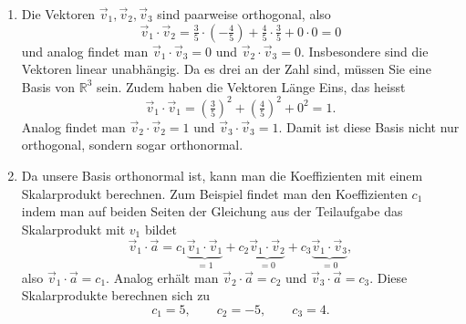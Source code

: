 \begin{losung*}
	\phantom{text}
	\begin{enumerate}[label=(\alph*)]
		\item Die Vektoren $\vec v_1,\vec v_2,\vec v_3$ sind paarweise orthogonal, also
		\begin{equation*}
			\vec v_1\cdot\vec v_2= \tfrac{3}{5}\cdot\left(-\tfrac{4}{5}\right)+\tfrac{4}{5}\cdot\tfrac{3}{5}+0\cdot 0=0
		\end{equation*}
		und analog findet man $\vec v_1\cdot\vec v_3=0$ und $\vec v_2\cdot\vec v_3=0$.
		Insbesondere sind die Vektoren linear unabhängig.
		Da es drei an der Zahl sind, müssen Sie eine Basis von $\mathbb R^3$ sein.
		Zudem haben die Vektoren Länge Eins, das heisst
		\begin{equation*}
			\vec v_1\cdot\vec v_1= \left(\tfrac{3}{5}\right)^2+\left(\tfrac{4}{5}\right)^2+0^2=1.
		\end{equation*}
		Analog findet man $\vec v_2\cdot\vec v_2=1$ und $\vec v_3\cdot\vec v_3=1$.
		Damit ist diese Basis nicht nur orthogonal, sondern sogar orthonormal.
		\item Da unsere Basis orthonormal ist, kann man die Koeffizienten mit einem Skalarprodukt berechnen.
		Zum Beispiel findet man den Koeffizienten $c_1$ indem man auf beiden Seiten der Gleichung aus der Teilaufgabe das Skalarprodukt mit $v_1$ bildet
		\begin{equation*}
			\vec v_1\cdot\vec a=c_1\underbrace{\vec v_1\cdot\vec v_1}_{=1}+c_2\underbrace{\vec v_1\cdot\vec v_2}_{=0}+c_3\underbrace{\vec v_1\cdot\vec v_3}_{=0},
		\end{equation*}
		also $\vec v_1\cdot\vec a=c_1$.
		Analog erhält man $\vec v_2\cdot\vec a=c_2$ und $\vec v_3\cdot\vec a=c_3$.
		Diese Skalarprodukte berechnen sich zu
		\begin{equation*}
			c_1=5,\quad\quad c_2=-5,\quad\quad c_3=4.
		\end{equation*}
	\end{enumerate}
\end{losung*}

